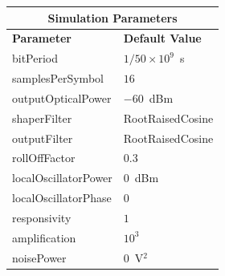 \begin{refsection}
\begin{table}[H]
	\centering
	\footnotesize
	\begin{tabular}{|l|l|}
		\hline
		\multicolumn{2}{|c|}{ \textbf{Simulation Parameters} } \\
		\hline
		\textbf{Parameter}     & \textbf{Default Value}                                     \\\hline
		bitPeriod              & $1/50\times10^9$~s														\\\hline
		samplesPerSymbol       & $16$                                                       \\\hline
		outputOpticalPower     & $-60$~dBm 													\\ \hline
		shaperFilter	       & RootRaisedCosine												\\ \hline
		outputFilter		   & RootRaisedCosine												\\ \hline
		rollOffFactor		   & 0.3														\\ \hline
		localOscillatorPower   & $0$~dBm                                                    \\ \hline
		localOscillatorPhase   & $0$                                                        \\ \hline
		responsivity           & $1$                                                        \\ \hline
		amplification          & $10^3$                                                     \\ \hline
		noisePower   & $0$~V$^2$                             					\\ \hline

\end{tabular}
\end{table}
\end{refsection}
